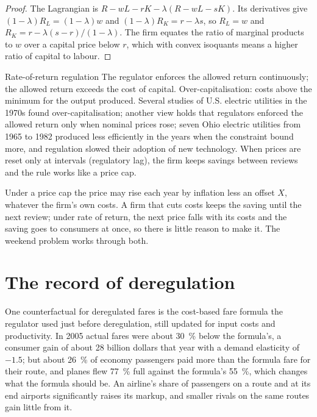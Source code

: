 \begin{proof}
The Lagrangian is $R - wL - rK - \lambda(R - wL - sK)$. Its derivatives give $(1 - \lambda)R_L = (1 - \lambda)w$ and $(1 - \lambda)R_K = r - \lambda s$, so
$R_L = w$ and $R_K = r - \lambda(s - r)/(1 - \lambda)$. The firm equates the ratio of marginal products to $w$ over a capital
price below $r$, which with convex isoquants means a higher ratio of capital to
labour.
\end{proof}

\begin{model}{Rate-of-return regulation}
\assumes The regulator enforces the allowed return continuously; the allowed
return exceeds the cost of capital.
\predicts Over-capitalisation: costs above the minimum for the output produced.
\tested Several studies of U.S. electric utilities in the 1970s found
over-capitalisation; another view holds that regulators enforced the allowed
return only when nominal prices rose; seven Ohio electric utilities from 1965 to 1982
produced less efficiently in the years when the constraint bound more, and
regulation slowed their adoption of new technology. %
\breaks When prices are reset only at intervals (regulatory lag), the firm keeps
savings between reviews and the rule works like a price cap.
\end{model}

Under a price cap the price may rise each year by inflation less an offset $X$,
whatever the firm's own costs. A firm that cuts costs keeps the saving until the
next review; under rate of return, the next price falls with its costs and the
saving goes to consumers at once, so there is little reason to make it. The weekend
problem works through both.

\section{The record of deregulation}\label{sec:b3:competition-policy:deregulation}

\begin{record}
One counterfactual for deregulated fares is the cost-based fare formula the
regulator used just before deregulation, still updated for input costs and
productivity. In 2005 actual fares were about 30~\% below the formula's, a consumer gain of
about 28 billion dollars that year with a demand elasticity of $-1.5$; but about 26~\% of economy
passengers paid more than the formula fare for their route, and planes flew 77~\% full
against the formula's 55~\%, which changes what the formula should be. %
An airline's share of passengers on a route and at its end airports significantly
raises its markup, and smaller rivals on the same routes gain little from it. %
\end{record}

